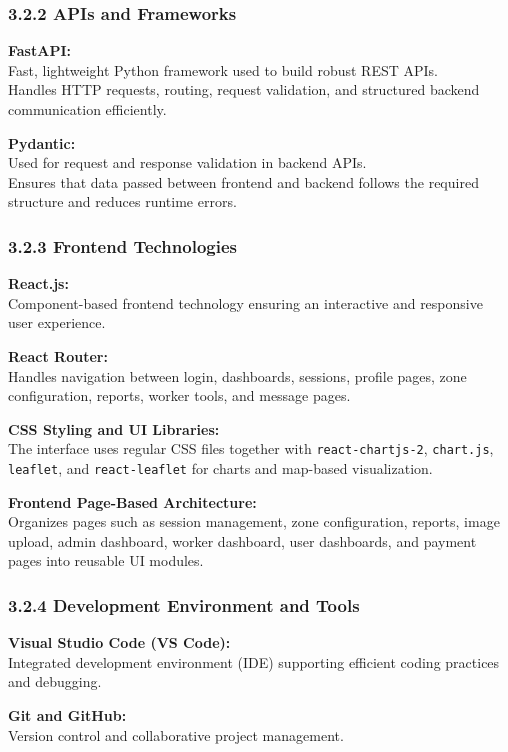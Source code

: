 \documentclass[12pt,a4paper,oneside]{report}
\begin{document}
\subsubsection*{3.2.2 APIs and Frameworks}
\textbf{FastAPI:}\\
Fast, lightweight Python framework used to build robust REST APIs.\\
Handles HTTP requests, routing, request validation, and structured backend communication efficiently.

\textbf{Pydantic:}\\
Used for request and response validation in backend APIs.\\
Ensures that data passed between frontend and backend follows the required structure and reduces runtime errors.

\subsubsection*{3.2.3 Frontend Technologies}
\textbf{React.js:}\\
Component-based frontend technology ensuring an interactive and responsive user experience.

\textbf{React Router:}\\
Handles navigation between login, dashboards, sessions, profile pages, zone configuration, reports, worker tools, and message pages.

\textbf{CSS Styling and UI Libraries:}\\
The interface uses regular CSS files together with \texttt{react-chartjs-2}, \texttt{chart.js}, \texttt{leaflet}, and \texttt{react-leaflet} for charts and map-based visualization.

\textbf{Frontend Page-Based Architecture:}\\
Organizes pages such as session management, zone configuration, reports, image upload, admin dashboard, worker dashboard, user dashboards, and payment pages into reusable UI modules.

\subsubsection*{3.2.4 Development Environment and Tools}
\textbf{Visual Studio Code (VS Code):}\\
Integrated development environment (IDE) supporting efficient coding practices and debugging.

\textbf{Git and GitHub:}\\
Version control and collaborative project management.
\end{document}
